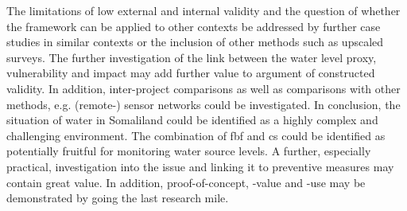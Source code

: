 The limitations of low external and internal validity and the question of whether the framework can be applied to other contexts be addressed by further case studies in similar contexts or the inclusion of other methods such as upscaled surveys. The further investigation of the link between the water level proxy, vulnerability and impact may add further value to argument of constructed validity. In addition, inter-project comparisons as well as comparisons with other methods, e.g. (remote-) sensor networks could be investigated.\newline
In conclusion, the situation of water in Somaliland could be identified as a highly complex and challenging environment. The combination of \acrlong{fbf} and \acrlong{cs} could be identified as potentially fruitful for monitoring water source levels. A further, especially practical, investigation into the issue and linking it to preventive measures may contain great value. In addition, proof-of-concept, -value and -use may be demonstrated by going the last research mile. 

